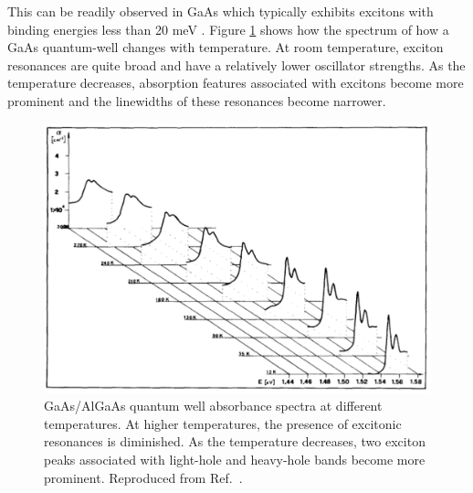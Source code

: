This can be readily observed in GaAs which typically exhibits excitons with binding energies less than 20 meV \cite{liang1970excitons}. Figure \ref{fig:gaas_vs_cnt_absorbance} shows how the spectrum of how a GaAs quantum-well changes with temperature. At room temperature, exciton resonances are quite broad and have a relatively lower oscillator strengths. As the temperature decreases, absorption features associated with excitons become more prominent and the linewidths of these resonances become narrower.

\begin{figure}[ht]
	\centering
	\includegraphics[scale=0.55]{images/chapter_optical_props/gaas_absorbance_filipowicz}
	\caption{GaAs/AlGaAs quantum well absorbance spectra at different temperatures. At higher temperatures, the presence of excitonic resonances is diminished. As the temperature decreases, two exciton peaks associated with light-hole and heavy-hole bands become more prominent. Reproduced from Ref.\ \cite{filipowicz1990temperature}.}
	\label{fig:gaas_vs_cnt_absorbance}
\end{figure}


